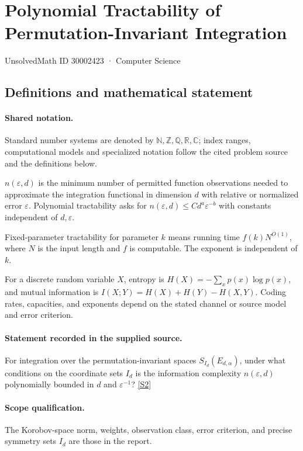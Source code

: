 \documentclass[11pt]{article}
\newcommand{\sref}[2]{\hyperlink{source:#1:#2}{[S#2]}}
\begin{document}
\setcounter{section}{30002422}
\section{Polynomial Tractability of Permutation-Invariant Integration}\label{30002423}
{\small\sffamily UnsolvedMath ID 30002423 · Computer Science}
\subsection{Definitions and mathematical statement}

\paragraph{Shared notation.}Standard number systems are denoted by $\mathbb N,\mathbb Z,\mathbb Q,\mathbb R,\mathbb C$; index ranges, computational models and specialized notation follow the cited problem source and the definitions below.


$n(\varepsilon,d)$ is the minimum number of permitted function observations needed to approximate the integration functional in dimension $d$ with relative or normalized error $\varepsilon$. Polynomial tractability asks for $n(\varepsilon,d)\leq C d^a\varepsilon^{-b}$ with constants independent of $d,\varepsilon$.

Fixed-parameter tractability for parameter $k$ means running time $f(k)N^{O(1)}$, where $N$ is the input length and $f$ is computable. The exponent is independent of $k$.

For a discrete random variable $X$, entropy is $H(X)=-\sum_xp(x)\log p(x)$, and mutual information is $I(X;Y)=H(X)+H(Y)-H(X,Y)$. Coding rates, capacities, and exponents depend on the stated channel or source model and error criterion.
\paragraph{Statement recorded in the supplied source.}
For integration over the permutation-invariant spaces $S_{I_d}(E_{d,\alpha})$, under what conditions on the coordinate sets $I_d$ is the information complexity $n(\varepsilon,d)$ polynomially bounded in $d$ and $\varepsilon^{-1}$? \sref{30002423}{2}
\paragraph{Scope qualification.}
The Korobov-space norm, weights, observation class, error criterion, and precise symmetry sets $I_d$ are those in the report.
\end{document}
